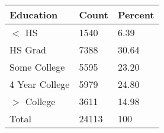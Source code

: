 \begin{table}[ht]
\centering
\begin{tabular}{lll}
 Education & Count & Percent \\ 
  \hline
$<$ HS & 1540 &  6.39 \\ 
  HS Grad & 7388 & 30.64 \\ 
  Some College & 5595 & 23.20 \\ 
  4 Year College & 5979 & 24.80 \\ 
  $>$ College & 3611 & 14.98 \\ 
   \hline
Total & 24113 & 100 \\ 
  \end{tabular}
\end{table}
